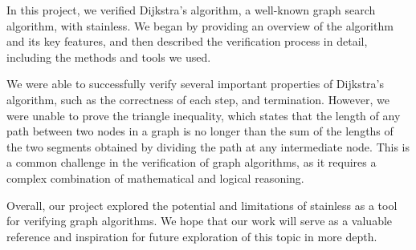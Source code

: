 \documentclass[11pt,a4paper]{article}
\begin{document}
In this project, we verified Dijkstra's algorithm, a well-known graph search algorithm, with stainless. We began by providing an overview of the algorithm and its key features, and then described the verification process in detail, including the methods and tools we used. 

We were able to successfully verify several important properties of Dijkstra's algorithm, such as the correctness of each step, and termination. However, we were unable to prove the triangle inequality, which states that the length of any path between two nodes in a graph is no longer than the sum of the lengths of the two segments obtained by dividing the path at any intermediate node. This is a common challenge in the verification of graph algorithms, as it requires a complex combination of mathematical and logical reasoning. 

Overall, our project explored the potential and limitations of stainless as a tool for verifying graph algorithms. We hope that our work will serve as a valuable reference and inspiration for future exploration of this topic in more depth. 






\end{document}
